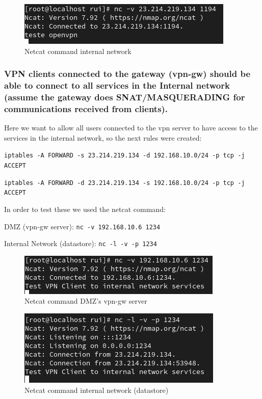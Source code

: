 \documentclass{article}
\begin{document}
\begin{figure}[H]
    \centering
    \includegraphics[scale=0.5]{btw/btw_openvpn_internal.png}
    \caption{Netcat command internal network}
    \label{fig:network-arc}
\end{figure}


\subsubsection{VPN clients connected to the gateway (vpn-gw) should be able to connect to all services in the Internal network (assume 
the gateway does SNAT/MASQUERADING for communications received from clients).}
\texttt{}\par Here we want to allow all users connected to the vpn server to have access to the services in the internal network, so the next rules were created:


\texttt{}\par
\texttt{iptables -A FORWARD -s 23.214.219.134 -d 192.168.10.0/24 -p tcp -j ACCEPT }\par
\texttt{iptables -A FORWARD -d 23.214.219.134 -s 192.168.10.0/24 -p tcp -j ACCEPT}\par
\texttt{}\par


In order to test these we used the netcat command:
\texttt{}\par
\texttt{}\par
DMZ (vpn-gw server): \texttt{nc -v 192.168.10.6 1234} \par
Internal Network (datastore): \texttt{nc -l -v -p 1234} \par
\texttt{}\par
\begin{figure}[H]
    \centering
    \includegraphics[scale=0.5]{btw/btw_vpn_client_dmz.png}
    \caption{Netcat command DMZ's vpn-gw server}
    \label{fig:network-arc}
\end{figure}

\begin{figure}[H]
    \centering
    \includegraphics[scale=0.5]{btw/btw_vpn_client_internal.png}
    \caption{Netcat command internal network (datastore)}
    \label{fig:network-arc}
\end{figure}
\end{document}
